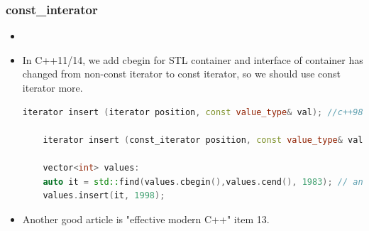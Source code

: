\documentclass[a4paper,12pt,twoside]{book}
\begin{document}
\subsubsection{const\_interator}
\begin{itemize}
	\item \item In C++11/14, we add cbegin for STL container and interface of container has changed from non-const iterator to const iterator, so we should use const iterator more. 
	\begin{lstlisting}[frame=single, language=c++]
	iterator insert (iterator position, const value_type& val); //c++98
	
	iterator insert (const_iterator position, const value_type& val); //c++11
	
	vector<int> values:
	auto it = std::find(values.cbegin(),values.cend(), 1983); // and cend
	values.insert(it, 1998);
	\end{lstlisting}
	
	
	\item Another good article is "effective modern C++" item 13. 
\end{itemize}
\end{document}
